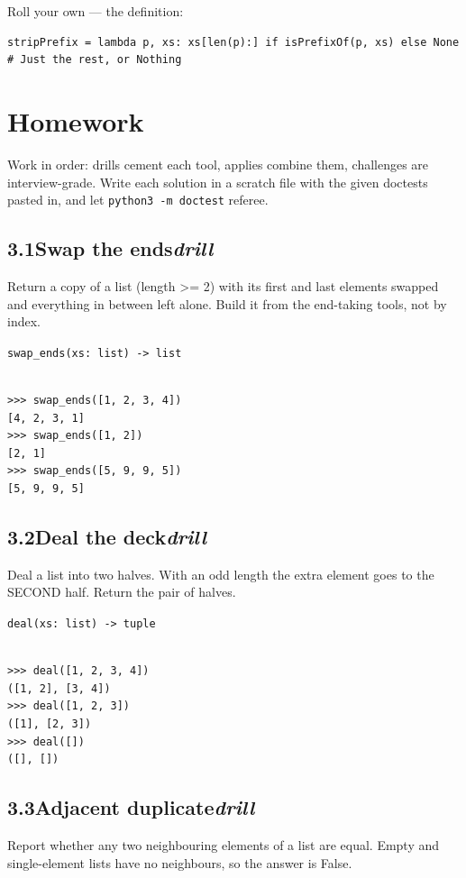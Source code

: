 \documentclass[10pt,letterpaper]{book}
\begin{document}
Roll your own --- the definition:

\begin{lstlisting}[style=ex]
stripPrefix = lambda p, xs: xs[len(p):] if isPrefixOf(p, xs) else None  # Just the rest, or Nothing
\end{lstlisting}

\section{Homework}
Work in order: drills cement each tool, applies combine them,
challenges are interview-grade. Write each solution in a scratch file with
the given doctests pasted in, and let \texttt{python3 -m doctest} referee.
\subsection*{3.1\quad Swap the ends\hfill\textnormal{\textit{drill}}}
Return a copy of a list (length >= 2) with its first and last elements swapped and everything in between left alone. Build it from the end-taking tools, not by index.

\noindent\texttt{swap\_ends(xs: list) -> list}
\begin{lstlisting}[style=ex]

>>> swap_ends([1, 2, 3, 4])
[4, 2, 3, 1]
>>> swap_ends([1, 2])
[2, 1]
>>> swap_ends([5, 9, 9, 5])
[5, 9, 9, 5]

\end{lstlisting}
\subsection*{3.2\quad Deal the deck\hfill\textnormal{\textit{drill}}}
Deal a list into two halves. With an odd length the extra element goes to the SECOND half. Return the pair of halves.

\noindent\texttt{deal(xs: list) -> tuple}
\begin{lstlisting}[style=ex]

>>> deal([1, 2, 3, 4])
([1, 2], [3, 4])
>>> deal([1, 2, 3])
([1], [2, 3])
>>> deal([])
([], [])

\end{lstlisting}
\subsection*{3.3\quad Adjacent duplicate\hfill\textnormal{\textit{drill}}}
Report whether any two neighbouring elements of a list are equal. Empty and single-element lists have no neighbours, so the answer is False.
\end{document}
